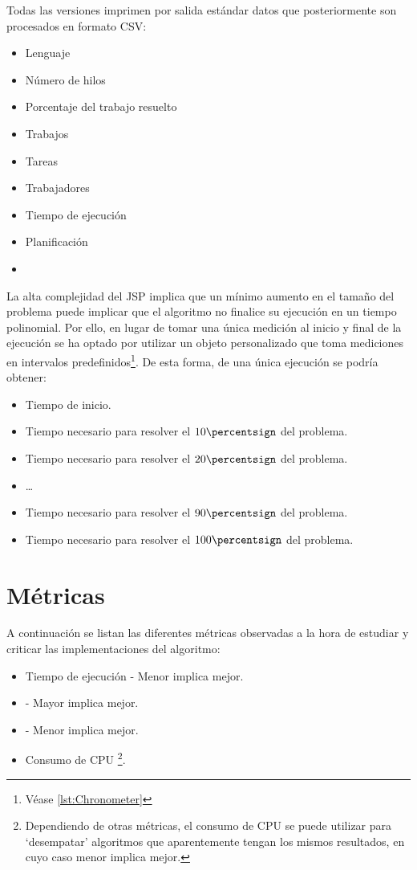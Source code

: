 Todas las versiones imprimen por salida estándar datos que posteriormente son
procesados en formato CSV:

\begin{itemize}[itemsep=0.25px]
    \item Lenguaje
    \item Número de hilos
    \item Porcentaje del trabajo resuelto
    \item Trabajos
    \item Tareas
    \item Trabajadores
    \item Tiempo de ejecución
    \item Planificación
    \item {}
\end{itemize}

La alta complejidad del JSP implica que un mínimo aumento en el tamaño del problema
puede implicar que el algoritmo no finalice su ejecución en un tiempo polinomial.
Por ello, en lugar de tomar una única medición al inicio y final de la ejecución
se ha optado por utilizar un objeto personalizado que toma mediciones en intervalos
predefinidos\footnote{Véase \ref{lst:Chronometer}}.
De esta forma, de una única ejecución se podría obtener:

\begin{itemize}[itemsep=0.25px]
    \item Tiempo de inicio.
    \item Tiempo necesario para resolver el $10\percentsign$ del problema.
    \item Tiempo necesario para resolver el $20\percentsign$ del problema.
    \item \dots
    \item Tiempo necesario para resolver el $90\percentsign$ del problema.
    \item Tiempo necesario para resolver el $100\percentsign$ del problema.
\end{itemize}

\section{Métricas}

A continuación se listan las diferentes métricas observadas a la hora
de estudiar y criticar las implementaciones del algoritmo:
\begin{itemize}[itemsep=0.25px]
    \item Tiempo de ejecución - Menor implica mejor.
    \item {} - Mayor implica mejor.
    \item {} - Menor implica mejor.
    \item Consumo de CPU \footnote{
        Dependiendo de otras métricas, el consumo de CPU se
        puede utilizar para `desempatar' algoritmos que
        aparentemente tengan los mismos resultados,
        en cuyo caso menor implica mejor.
    }.
\end{itemize}

